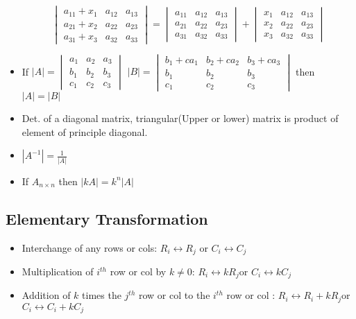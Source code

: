 \documentclass[12pt]{article}
\begin{document}
\begin{itemize}
	\[
		\begin{vmatrix}
		a_{11}+x_1 & a_{12} & a_{13} \\
		a_{21}+x_2 & a_{22} & a_{23} \\
		a_{31}+x_3 & a_{32} & a_{33} 
		\end{vmatrix}
		=
			\begin{vmatrix}
		a_{11} & a_{12} & a_{13} \\
		a_{21} & a_{22} & a_{23} \\
		a_{31} & a_{32} & a_{33} 
		\end{vmatrix}
		+
		\begin{vmatrix}
		x_1 & a_{12} & a_{13} \\
		x_2 & a_{22} & a_{23} \\
		x_3 & a_{32} & a_{33} 
		\end{vmatrix}	
	\]
	\item If $ |A| = \begin{vmatrix}
	a_{1} & a_{2} & a_{3} \\
	b_{1} & b_{2} & b_{3} \\
	c_{1} & c_{2} & c_{3} 
	\end{vmatrix}  $ $ |B| = \begin{vmatrix}
	b_1+ca_{1} & b_2+ca_{2} & b_3+ca_{3} \\
	b_{1} & b_{2} & b_{3} \\
	c_{1} & c_{2} & c_{3} 
	\end{vmatrix}  $ then $|A| = |B|$
	\item Det. of a diagonal matrix, triangular(Upper or lower) matrix is product of element of principle diagonal.
	\item $|A^{-1}| = \frac{1}{|A|}$
	\item If $A_{n\times n}$ then $|kA| = k^n|A|$
\end{itemize}

\subsection*{Elementary Transformation}
\begin{itemize}
	\item Interchange of any rows or cols: $R_{i} \leftrightarrow R_j$ or $C_i \leftrightarrow C_j$
	\item Multiplication of $i^{th}$ row or col by $k\not=0$: $R_{i} \leftrightarrow kR_j$or $C_i \leftrightarrow kC_j$
	\item Addition of $k$ times the $j^{th}$ row or col to the $i^{th}$ row or col : $R_{i} \leftrightarrow R_i+ kR_j$or $C_i \leftrightarrow C_i + kC_j$
\end{itemize}
\end{document}
